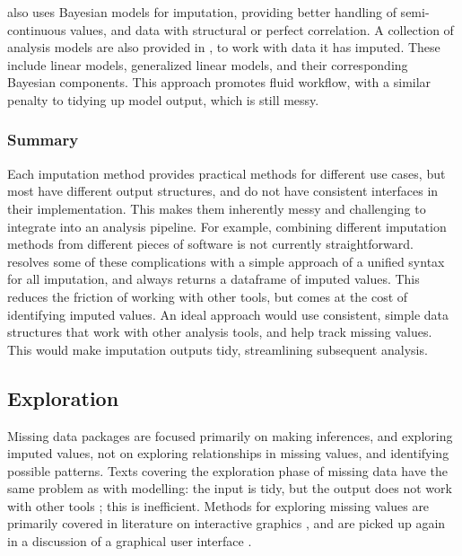 \documentclass[
]{jss}
\begin{document}
 \citep{mi} also uses Bayesian models for imputation, providing better handling of semi-continuous values, and data with structural or perfect correlation. A collection of analysis models are also provided in , to work with data it has imputed. These include linear models, generalized linear models, and their corresponding Bayesian components. This approach promotes fluid workflow, with a similar penalty to tidying up model output, which is still messy.

\hypertarget{imputation-summary}{%
\subsubsection{Summary}\label{imputation-summary}}

Each imputation method provides practical methods for different use cases, but most have different output structures, and do not have consistent interfaces in their implementation. This makes them inherently messy and challenging to integrate into an analysis pipeline. For example, combining different imputation methods from different pieces of software is not currently straightforward.  resolves some of these complications with a simple approach of a unified syntax for all imputation, and always returns a dataframe of imputed values. This reduces the friction of working with other tools, but comes at the cost of identifying imputed values. An ideal approach would use consistent, simple data structures that work with other analysis tools, and help track missing values. This would make imputation outputs tidy, streamlining subsequent analysis.

\hypertarget{exploration}{%
\subsection{Exploration}\label{exploration}}

Missing data packages are focused primarily on making inferences, and exploring imputed values, not on exploring relationships in missing values, and identifying possible patterns. Texts covering the exploration phase of missing data have the same problem as with modelling: the input is tidy, but the output does not work with other tools \citep{vanBuuren2018}; this is inefficient. Methods for exploring missing values are primarily covered in literature on interactive graphics \citep{Swayne1998, Unwin1996, Cook2007}, and are picked up again in a discussion of a graphical user interface \citep{Cheng2015}.
\end{document}
